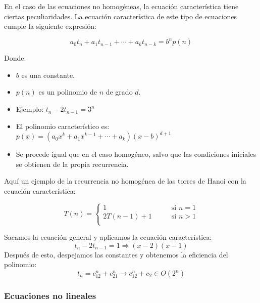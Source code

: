 \documentclass[10pt,a4paper,spanish]{report}
\theoremstyle{definition}
\theoremstyle{remark}
\begin{document}
En el caso de las ecuaciones no homogéneas, la ecuación característica tiene ciertas peculiaridades. La ecuación característica de este tipo de ecuaciones cumple la siguiente expresión:

\begin{displaymath}
    a_0t_n + a_1t_{n-1}+\cdots+a_kt_{n-k} = b^np(n)
\end{displaymath}

Donde:
\begin{itemize}
    \item $b$ es una constante.
    \item $p(n)$ es un polinomio de $n$ de grado $d$.
    \item Ejemplo: $t_n - 2t_{n-1} = 3^n$
    \item El polinomio característico es: $p(x) = (a_0x^k + a_1x^{k-1}+\cdots+a_k)(x-b)^{d+1}$
    \item Se procede igual que en el caso homogéneo, salvo que las condiciones iniciales se obtienen de la propia recurrencia.
\end{itemize}

Aquí un ejemplo de la recurrencia no homogénea de las torres de Hanoi con la ecuación característica:

\begin{displaymath}
        T(n) = \left\{ \begin{array}{ll}
1 & \qquad \textrm{si $n = 1$}\\
2T(n - 1) + 1 & \qquad \textrm{si $n > 1$} \\
\end{array} \right.
\end{displaymath}
\begin{center}
Sacamos la ecuación general y aplicamos la ecuación característica:
\begin{displaymath}
    t_n - 2 t_{n-1} = 1 \Rightarrow (x - 2)(x - 1)
\end{displaymath}
Después de esto, despejamos las constantes y obtenemos la eficiencia del polinomio:
\begin{displaymath}
    t_n = c_12^n + c_21^n \rightarrow c_12^n + c_2 \in O(2^n)
\end{displaymath}
\end{center}

\subsubsection{\textcolor{YellowOrange}Ecuaciones no lineales}
\end{document}
